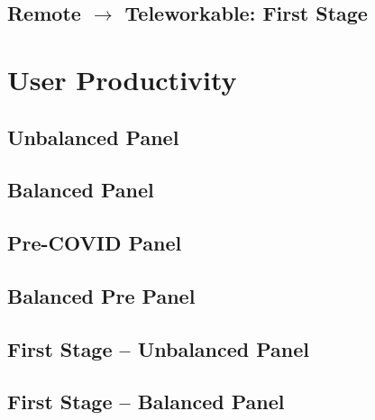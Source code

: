 \documentclass{article}
\newcommand{\cleanedresultsdir}{../../results/cleaned}
\begin{document}
\subsection{Remote $\rightarrow$ Teleworkable: First Stage}



\clearpage
\section{User Productivity}
\label{sec:user_productivity}

\subsection{Unbalanced Panel}


\subsection{Balanced Panel}


\subsection{Pre-COVID Panel}


\subsection{Balanced Pre Panel}


\subsection{First Stage -- Unbalanced Panel}


\subsection{First Stage -- Balanced Panel}

\end{document}
